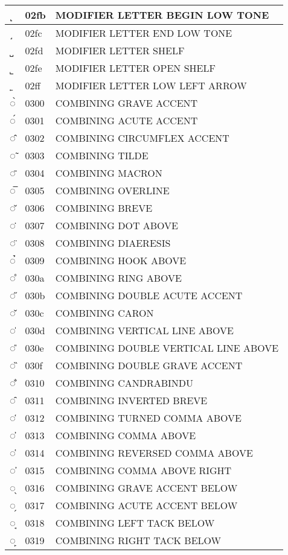 \documentclass[12pt,letterpaper,openany]{book}
\begin{document}
\begin{center}
\begin{supertabular}{|m{0.25in}|m{0.5in}|m{4in}|}
˻ & 02fb & MODIFIER LETTER BEGIN LOW TONE\\\hline
˼ & 02fc & MODIFIER LETTER END LOW TONE\\\hline
˽ & 02fd & MODIFIER LETTER SHELF\\\hline
˾ & 02fe & MODIFIER LETTER OPEN SHELF\\\hline
˿ & 02ff & MODIFIER LETTER LOW LEFT ARROW\\\hline
◌̀ & 0300 & COMBINING GRAVE ACCENT\\\hline
◌́ & 0301 & COMBINING ACUTE ACCENT\\\hline
◌̂ & 0302 & COMBINING CIRCUMFLEX ACCENT\\\hline
◌̃ & 0303 & COMBINING TILDE\\\hline
◌̄ & 0304 & COMBINING MACRON\\\hline
◌̅ & 0305 & COMBINING OVERLINE\\\hline
◌̆ & 0306 & COMBINING BREVE\\\hline
◌̇ & 0307 & COMBINING DOT ABOVE\\\hline
◌̈ & 0308 & COMBINING DIAERESIS\\\hline
◌̉ & 0309 & COMBINING HOOK ABOVE\\\hline
◌̊ & 030a & COMBINING RING ABOVE\\\hline
◌̋ & 030b & COMBINING DOUBLE ACUTE ACCENT\\\hline
◌̌ & 030c & COMBINING CARON\\\hline
◌̍ & 030d & COMBINING VERTICAL LINE ABOVE\\\hline
◌̎ & 030e & COMBINING DOUBLE VERTICAL LINE ABOVE\\\hline
◌̏ & 030f & COMBINING DOUBLE GRAVE ACCENT\\\hline
◌̐ & 0310 & COMBINING CANDRABINDU\\\hline
◌̑ & 0311 & COMBINING INVERTED BREVE\\\hline
◌̒ & 0312 & COMBINING TURNED COMMA ABOVE\\\hline
◌̓ & 0313 & COMBINING COMMA ABOVE\\\hline
◌̔ & 0314 & COMBINING REVERSED COMMA ABOVE\\\hline
◌̕ & 0315 & COMBINING COMMA ABOVE RIGHT\\\hline
◌̖ & 0316 & COMBINING GRAVE ACCENT BELOW\\\hline
◌̗ & 0317 & COMBINING ACUTE ACCENT BELOW\\\hline
◌̘ & 0318 & COMBINING LEFT TACK BELOW\\\hline
◌̙ & 0319 & COMBINING RIGHT TACK BELOW\\\hline

\end{supertabular}
\end{center}
\end{document}
